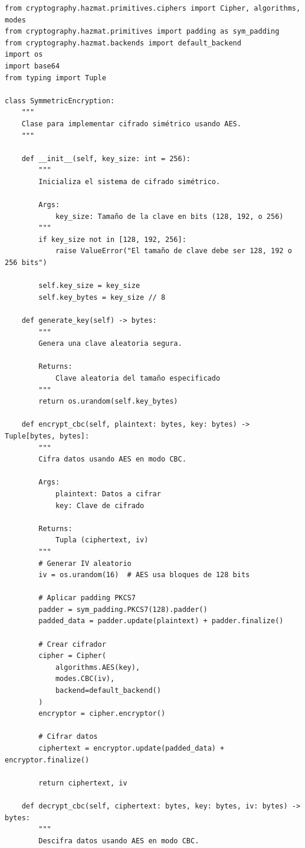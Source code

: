 \documentclass[12pt,a4paper]{article}
\begin{document}
\begin{lstlisting}[caption=Implementación de cifrado simétrico con AES]
from cryptography.hazmat.primitives.ciphers import Cipher, algorithms, modes
from cryptography.hazmat.primitives import padding as sym_padding
from cryptography.hazmat.backends import default_backend
import os
import base64
from typing import Tuple

class SymmetricEncryption:
    """
    Clase para implementar cifrado simétrico usando AES.
    """
    
    def __init__(self, key_size: int = 256):
        """
        Inicializa el sistema de cifrado simétrico.
        
        Args:
            key_size: Tamaño de la clave en bits (128, 192, o 256)
        """
        if key_size not in [128, 192, 256]:
            raise ValueError("El tamaño de clave debe ser 128, 192 o 256 bits")
            
        self.key_size = key_size
        self.key_bytes = key_size // 8
        
    def generate_key(self) -> bytes:
        """
        Genera una clave aleatoria segura.
        
        Returns:
            Clave aleatoria del tamaño especificado
        """
        return os.urandom(self.key_bytes)
    
    def encrypt_cbc(self, plaintext: bytes, key: bytes) -> Tuple[bytes, bytes]:
        """
        Cifra datos usando AES en modo CBC.
        
        Args:
            plaintext: Datos a cifrar
            key: Clave de cifrado
            
        Returns:
            Tupla (ciphertext, iv)
        """
        # Generar IV aleatorio
        iv = os.urandom(16)  # AES usa bloques de 128 bits
        
        # Aplicar padding PKCS7
        padder = sym_padding.PKCS7(128).padder()
        padded_data = padder.update(plaintext) + padder.finalize()
        
        # Crear cifrador
        cipher = Cipher(
            algorithms.AES(key),
            modes.CBC(iv),
            backend=default_backend()
        )
        encryptor = cipher.encryptor()
        
        # Cifrar datos
        ciphertext = encryptor.update(padded_data) + encryptor.finalize()
        
        return ciphertext, iv
    
    def decrypt_cbc(self, ciphertext: bytes, key: bytes, iv: bytes) -> bytes:
        """
        Descifra datos usando AES en modo CBC.
        

\end{lstlisting}
\end{document}
